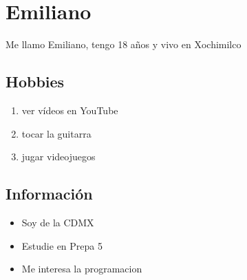 \chapter{Emiliano}
Me llamo Emiliano, tengo 18 años y vivo en Xochimilco

\section{Hobbies}

\begin{enumerate}
\item ver vídeos en YouTube
\item tocar la guitarra
\item jugar videojuegos
\end {enumerate}

\section{Información}

\begin{itemize}
\item Soy de la CDMX
\item Estudie en Prepa 5
\item Me interesa la programacion
\end{itemize}
